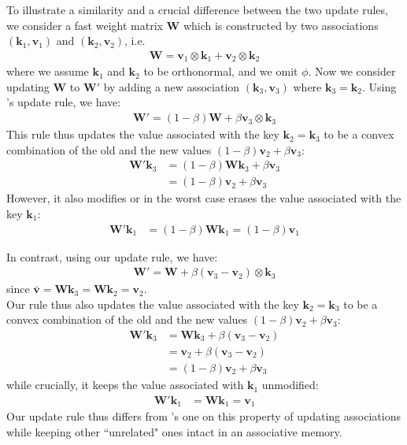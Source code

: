 \documentclass{article}
\def\vk{{\bm{k}}}
\def\vv{{\bm{v}}}
\def\mW{{\bm{W}}}
\theoremstyle{definition}
\begin{document}
To illustrate a similarity and a crucial difference between the two update rules,
we consider a fast weight matrix $\mW$ which is constructed by two associations $(\vk_1, \vv_1)$
and $(\vk_2, \vv_2)$, i.e.
\begin{align}
\mW = \vv_1 \otimes \vk_1 + \vv_2 \otimes \vk_2
\end{align}
where we assume $\vk_1$ and $\vk_2$ to be orthonormal, and we omit $\phi$.
Now we consider updating $\mW$ to $\mW'$ by adding a new association $(\vk_3, \vv_3)$ where $\vk_3=\vk_2$.
Using \citet{peng2021random}'s update rule, we have:
\begin{align*}
\mW'= (1-\beta) \mW + \beta \vv_3 \otimes \vk_3 
\end{align*}
This rule thus updates the value associated with the key $\vk_2=\vk_3$ to be a convex combination of the old and the new values $(1-\beta) \vv_2 + \beta \vv_3$:
\begin{align*}
\mW' \vk_3 &= (1-\beta) \mW \vk_3 + \beta \vv_3 \\
&= (1-\beta) \vv_2 + \beta \vv_3 
\end{align*}
However, it also modifies or in the worst case erases the value associated with the key $\vk_1$:
\begin{align*}
\mW' \vk_1 &= (1-\beta)  \mW \vk_1 = (1-\beta)  \vv_1
\end{align*}

In contrast, using our update rule, we have:
\begin{align*}
\mW'= \mW + \beta (\vv_3 - \vv_2) \otimes \vk_3 
\end{align*}
since $\bar{\vv} = \mW \vk_3 = \mW \vk_2 = \vv_2$.\\
Our rule thus also updates the value associated with the key $\vk_2=\vk_3$ to be a convex combination of the old and the new values $(1-\beta) \vv_2 + \beta \vv_3$:
\begin{align*}
\mW' \vk_3 &= \mW \vk_3 + \beta (\vv_3 - \vv_2) \\
& = \vv_2 + \beta (\vv_3 - \vv_2) \\
&=(1-\beta) \vv_2 + \beta \vv_3
\end{align*}
while crucially, it keeps the value associated with $\vk_1$ unmodified:
\begin{align*}
\mW' \vk_1 &= \mW \vk_1 = \vv_1
\end{align*}
Our update rule thus differs from \citet{peng2021random}'s one on this property of updating associations while
keeping other ``unrelated" ones intact in an associative memory.
\end{document}
